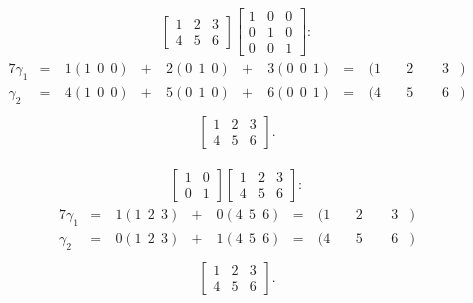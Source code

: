 \documentclass[12pt]{article}
\begin{document}
\begin{exm}
  \begin{align*}
    \begin{bmatrix}
      1 & 2 & 3\\
      4 & 5 & 6
    \end{bmatrix}
    \begin{bmatrix}
      1 & 0 & 0\\
      0 & 1 & 0\\
      0 & 0 & 1
    \end{bmatrix}:
  \end{align*}
  \begin{alignat*}{7}
    \gamma_1 &=&\ 1(1\ \ 0\ \ 0) &+&\ 2(0\ \ 1\ \ 0) &+&\ 3(0\ \ 0\ \ 1)
      &=&\ (1&\ &2&\ \ &3&)\\
    \gamma_2 &=&\ 4(1\ \ 0\ \ 0) &+&\ 5(0\ \ 1\ \ 0) &+&\ 6(0\ \ 0\ \ 1)
      &=&\ (4&\ &5&\ \ &6&)\\
  \end{alignat*}
  \begin{align*}
    \begin{bmatrix}
      1 & 2 & 3\\
      4 & 5 & 6
    \end{bmatrix}.
  \end{align*}
\end{exm}

\begin{exm}
  \begin{align*}
    \begin{bmatrix}
      1 & 0\\
      0 & 1
    \end{bmatrix}
    \begin{bmatrix}
      1 & 2 & 3\\
      4 & 5 & 6
    \end{bmatrix}:
  \end{align*}
  \begin{alignat*}{7}
    \gamma_1 &=&\ 1(1\ \ 2\ \ 3) &+&\ 0(4\ \ 5\ \ 6)
      &=&\ (1&\ &2&\ \ &3&)\\
    \gamma_2 &=&\ 0(1\ \ 2\ \ 3) &+&\ 1(4\ \ 5\ \ 6)
      &=&\ (4&\ &5&\ \ &6&)\\
  \end{alignat*}
  \begin{align*}
    \begin{bmatrix}
      1 & 2 & 3\\
      4 & 5 & 6
    \end{bmatrix}.
  \end{align*}
\end{exm}
\end{document}
